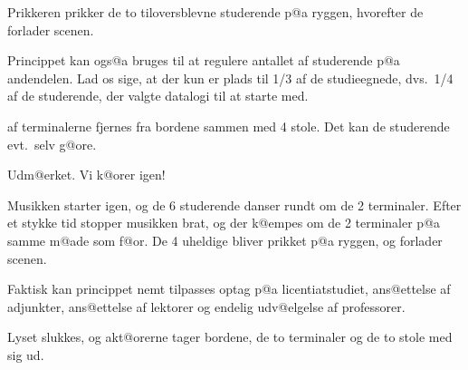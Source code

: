 \documentclass[a4paper,11pt]{article}
\begin{document}
\begin{sketch}
\scene Prikkeren prikker de to tiloversblevne studerende p@a ryggen,
hvorefter de forlader scenen.

 Princippet kan ogs@a bruges til at regulere antallet
             af studerende p@a andendelen. Lad os sige, at der kun
             er plads til 1/3 af de studieegnede, dvs.\ 1/4 af de
             studerende, der valgte datalogi til at starte med.

 af terminalerne fjernes fra bordene sammen med 4 stole. Det kan
de studerende evt.\ selv g@ore.

 Udm@erket. Vi k@orer igen!

\scene
Musikken starter igen, og de 6 studerende danser rundt om de 2
terminaler. Efter et stykke tid stopper musikken brat, og der
k@empes om de 2 terminaler p@a samme m@ade som f@or. De 4 uheldige
bliver prikket p@a ryggen, og forlader scenen.

 Faktisk kan princippet nemt tilpasses optag p@a
licentiatstudiet, ans@ettelse af adjunkter, ans@ettelse af lektorer og
endelig udv@elgelse af professorer.

\scene
Lyset slukkes, og akt@orerne tager bordene, de to terminaler og de
to stole med sig ud.

\end{sketch}
\end{document}
